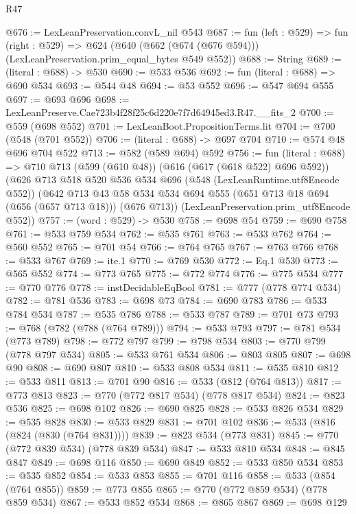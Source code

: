 \begin{lexlean}{R47}
\begin{coremodule}
@676 := LexLeanPreservation.convL_nil @543
@687 := fun (left : @529) =>
  fun (right : @529) =>
  @624 (@640 (@662 (@674 (@676 @594))) (LexLeanPreservation.prim_equal_bytes @549 @552))
@688 := String
@689 := (literal : @688) -> @530
@690 := @533 @536
@692 := fun (literal : @688) => @690 @534
@693 := @544 @48
@694 := @53 @552
@696 := @547 @694 @555
@697 := @693 @696
@698 := LexLeanPreserve.Cae723b4f28f25c6d220e7f7d64945ed3.R47.__fits_2
@700 := @559 (@698 @552)
@701 := LexLeanBoot.PropositionTerms.lit
@704 := @700 (@548 (@701 @552))
@706 := (literal : @688) -> @697 @704
@710 := @574 @48 @696 @704 @522
@713 := @582 (@589 @694) @592
@756 := fun (literal : @688) =>
  @710
    @713
    (@599 (@610 @48))
    (@616 (@617 (@618 @522) @696 @592))
    (@626
      @713
      @518
      @520
      @536
      @534
      @696
      (@548 (LexLeanRuntime.utf8Encode @552))
      (@642
        @713
        @43
        @58
        @534
        @534
        @694
        @555
        (@651 @713 @18 @694 (@656 (@657 @713 @18)))
        (@676 @713))
      (LexLeanPreservation.prim_utf8Encode @552))
@757 := (word : @529) -> @530
@758 := @698 @54
@759 := @690 @758
@761 := @533 @759 @534
@762 := @535 @761
@763 := @533 @762
@764 := @560 @552
@765 := @701 @54
@766 := @764 @765
@767 := @763 @766
@768 := @533 @767
@769 := ite.{1}
@770 := @769 @530
@772 := Eq.{1} @530
@773 := @565 @552
@774 := @773 @765
@775 := @772 @774
@776 := @775 @534
@777 := @770 @776
@778 := instDecidableEqBool
@781 := @777 (@778 @774 @534)
@782 := @781 @536
@783 := @698 @73
@784 := @690 @783
@786 := @533 @784 @534
@787 := @535 @786
@788 := @533 @787
@789 := @701 @73
@793 := @768 (@782 (@788 (@764 @789)))
@794 := @533 @793
@797 := @781 @534 (@773 @789)
@798 := @772 @797
@799 := @798 @534
@803 := @770 @799 (@778 @797 @534)
@805 := @533 @761 @534
@806 := @803 @805
@807 := @698 @90
@808 := @690 @807
@810 := @533 @808 @534
@811 := @535 @810
@812 := @533 @811
@813 := @701 @90
@816 := @533 (@812 (@764 @813))
@817 := @773 @813
@823 := @770 (@772 @817 @534) (@778 @817 @534)
@824 := @823 @536
@825 := @698 @102
@826 := @690 @825
@828 := @533 @826 @534
@829 := @535 @828
@830 := @533 @829
@831 := @701 @102
@836 := @533 (@816 (@824 (@830 (@764 @831))))
@839 := @823 @534 (@773 @831)
@845 := @770 (@772 @839 @534) (@778 @839 @534)
@847 := @533 @810 @534
@848 := @845 @847
@849 := @698 @116
@850 := @690 @849
@852 := @533 @850 @534
@853 := @535 @852
@854 := @533 @853
@855 := @701 @116
@858 := @533 (@854 (@764 @855))
@859 := @773 @855
@865 := @770 (@772 @859 @534) (@778 @859 @534)
@867 := @533 @852 @534
@868 := @865 @867
@869 := @698 @129

\end{coremodule}
\end{lexlean}
